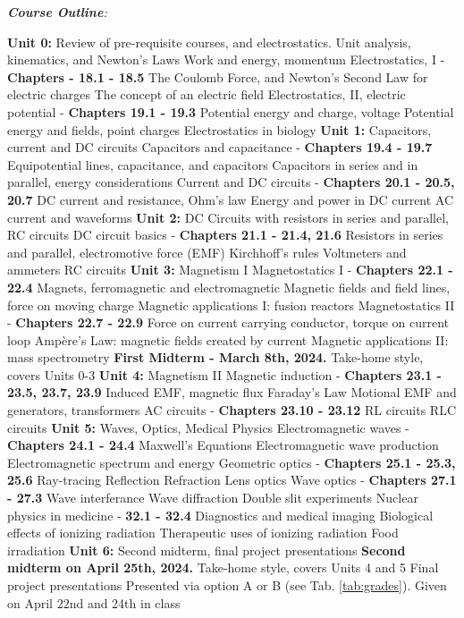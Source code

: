 \documentclass[10pt]{article}
\begin{document}
\clearpage
\twocolumn
\textit{\textbf{Course Outline}:}
\begin{outline}[enumerate]
\1 \textbf{Unit 0:} Review of pre-requisite courses, and electrostatics.
\2 Unit analysis, kinematics, and Newton's Laws
\2 Work and energy, momentum
\2 Electrostatics, I - \textbf{Chapters - 18.1 - 18.5}
\3 The Coulomb Force, and Newton's Second Law for electric charges
\3 The concept of an electric field
\2 Electrostatics, II, electric potential - \textbf{Chapters 19.1 - 19.3}
\3 Potential energy and charge, voltage
\3 Potential energy and fields, point charges
\3 Electrostatics in biology
\1 \textbf{Unit 1:} Capacitors, current and DC circuits
\2 Capacitors and capacitance - \textbf{Chapters 19.4 - 19.7}
\3 Equipotential lines, capacitance, and capacitors
\3 Capacitors in series and in parallel, energy considerations
\2 Current and DC circuits - \textbf{Chapters 20.1 - 20.5, 20.7}
\3 DC current and resistance, Ohm's law
\3 Energy and power in DC current
\3 AC current and waveforms
\1 \textbf{Unit 2:} DC Circuits with resistors in series and parallel, RC circuits
\2 DC circuit basics - \textbf{Chapters 21.1 - 21.4, 21.6}
\3 Resistors in series and parallel, electromotive force (EMF)
\3 Kirchhoff's rules
\3 Voltmeters and ammeters
\3 RC circuits
\1 \textbf{Unit 3:} Magnetism I
\2 Magnetostatics I - \textbf{Chapters 22.1 - 22.4}
\3 Magnets, ferromagnetic and electromagnetic
\3 Magnetic fields and field lines, force on moving charge
\3 Magnetic applications I: fusion reactors
\2 Magnetostatics II - \textbf{Chapters 22.7 - 22.9}
\3 Force on current carrying conductor, torque on current loop
\3 Amp\`{e}re's Law: magnetic fields created by current
\3 Magnetic applications II: mass spectrometry
\1 \textbf{First Midterm - March 8th, 2024.}
\2 Take-home style, covers Units 0-3
\1 \textbf{Unit 4:} Magnetism II
\2 Magnetic induction - \textbf{Chapters 23.1 - 23.5, 23.7, 23.9}
\3 Induced EMF, magnetic flux
\3 Faraday's Law
\3 Motional EMF and generators, transformers
\2 AC circuits - \textbf{Chapters 23.10 - 23.12}
\3 RL circuits
\3 RLC circuits
\1 \textbf{Unit 5:} Waves, Optics, Medical Physics
\2 Electromagnetic waves - \textbf{Chapters 24.1 - 24.4}
\3 Maxwell's Equations
\3 Electromagnetic wave production
\3 Electromagnetic spectrum and energy
\2 Geometric optics - \textbf{Chapters 25.1 - 25.3, 25.6}
\3 Ray-tracing
\3 Reflection
\3 Refraction
\3 Lens optics
\2 Wave optics - \textbf{Chapters 27.1 - 27.3}
\3 Wave interferance
\3 Wave diffraction
\3 Double slit experiments
\2 Nuclear physics in medicine - \textbf{32.1 - 32.4}
\3 Diagnostics and medical imaging
\3 Biological effects of ionizing radiation
\3 Therapeutic uses of ionizing radiation
\3 Food irradiation
\1 \textbf{Unit 6:} Second midterm, final project presentations
\2 \textbf{Second midterm on April 25th, 2024.}
\3 Take-home style, covers Units 4 and 5
\2 Final project presentations
\3 Presented via option A or B (see Tab. \ref{tab:grades}).
\3 Given on April 22nd and 24th in class
\end{outline}
\end{document}
